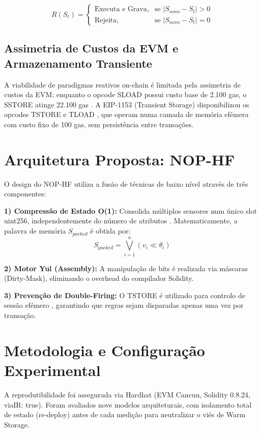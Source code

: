 \documentclass[conference]{IEEEtran}
\begin{document}
\begin{equation}
R(S_t) = 
\begin{cases} 
\text{Executa e Grava}, & \text{se } |S_{novo} - S_t| > 0 \\
\text{Rejeita}, & \text{se } |S_{novo} - S_t| = 0 
\end{cases}
\end{equation}

\subsection{Assimetria de Custos da EVM e Armazenamento Transiente}
A viabilidade de paradigmas reativos on-chain é limitada pela assimetria de custos da EVM: enquanto o opcode SLOAD possui custo base de 2.100 gas, o SSTORE atinge 22.100 gas \cite{eip2200}. A EIP-1153 (Transient Storage) disponibilizou os opcodes TSTORE e TLOAD \cite{eip1153_official} \cite{eip1153_magicians}, que operam numa camada de memória efémera com custo fixo de 100 gas, sem persistência entre transações.

\section{Arquitetura Proposta: NOP-HF}
O design do NOP-HF utiliza a fusão de técnicas de baixo nível através de três componentes:

\textbf{1) Compressão de Estado O(1):} Consolida múltiplos sensores num único slot uint256, independentemente do número de atributos \cite{alchemy_yul} \cite{rareskills_gas}. Matematicamente, a palavra de memória $S_{packed}$ é obtida por:
\begin{equation}
S_{packed} = \bigvee_{i=1}^{n} (v_i \ll \theta_i)
\end{equation}

\textbf{2) Motor Yul (Assembly):} A manipulação de bits é realizada via máscaras (Dirty-Mask), eliminando o overhead do compilador Solidity.

\textbf{3) Prevenção de Double-Firing:} O TSTORE é utilizado para controlo de sessão efémero \cite{dedaub_transient}, garantindo que regras sejam disparadas apenas uma vez por transação.

\section{Metodologia e Configuração Experimental}
A reprodutibilidade foi assegurada via Hardhat (EVM Cancun, Solidity 0.8.24, viaIR: true). Foram avaliados nove modelos arquiteturais, com isolamento total de estado (re-deploy) antes de cada medição para neutralizar o viés de Warm Storage.
\end{document}
